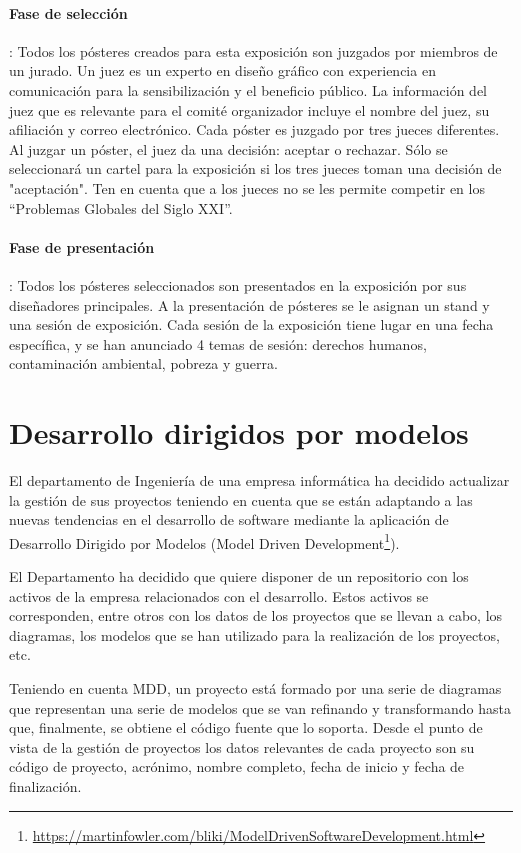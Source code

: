 \documentclass[a4paper]{article}
\begin{document}
\paragraph{Fase de selección}: Todos los pósteres creados para esta exposición son juzgados por miembros de un jurado.  Un juez es un experto en diseño gráfico con experiencia en comunicación para la sensibilización y el beneficio público.  La información del juez que es relevante para el comité organizador incluye el nombre del juez, su afiliación y correo electrónico.  Cada póster es juzgado por tres jueces diferentes.  Al juzgar un póster, el juez da una decisión: aceptar o rechazar.  Sólo se seleccionará un cartel para la exposición si los tres jueces toman una decisión de "aceptación".  Ten en cuenta que a los jueces no se les permite competir en los ``Problemas Globales del Siglo XXI''.
\paragraph{Fase de presentación}: Todos los pósteres seleccionados son presentados en la exposición por sus diseñadores principales.  A la presentación de pósteres se le asignan un stand y una sesión de exposición.  Cada sesión de la exposición tiene lugar en una fecha específica, y se han anunciado 4 temas de sesión: derechos humanos, contaminación ambiental, pobreza y guerra.

\section{Desarrollo dirigidos por modelos}
El departamento de Ingeniería de una empresa informática ha decidido actualizar la gestión de sus proyectos teniendo en cuenta que se están adaptando a las nuevas tendencias en el desarrollo de software mediante la aplicación de Desarrollo Dirigido por Modelos (Model Driven Development\footnote{\url{https://martinfowler.com/bliki/ModelDrivenSoftwareDevelopment.html}}).

El Departamento ha decidido que quiere disponer de un repositorio con los activos de la empresa relacionados con el desarrollo. Estos activos se corresponden, entre otros con los datos de los proyectos que se llevan a cabo, los diagramas, los modelos que se han utilizado para la realización de los proyectos, etc.

Teniendo en cuenta MDD, un proyecto está formado por una serie de diagramas que representan una serie de modelos que se van refinando y transformando hasta que, finalmente, se obtiene el código fuente que lo soporta. Desde el punto de vista de la gestión de proyectos los datos relevantes de cada proyecto son su código de proyecto, acrónimo, nombre completo, fecha de inicio y fecha de finalización.
\end{document}
